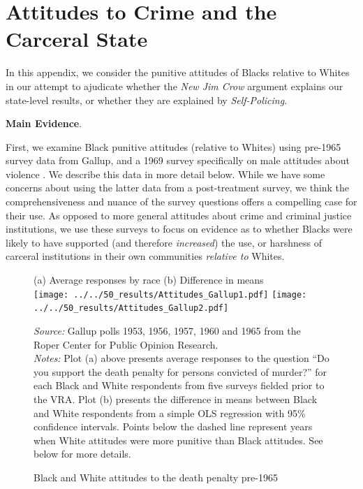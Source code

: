 \documentclass[12pt]{article}
\begin{document}
\section{Attitudes to Crime and the Carceral State}\label{appendix_attitudes}
\setcounter{table}{0}
\setcounter{figure}{0}
\renewcommand{\thetable}{I\arabic{table}}
\renewcommand{\thefigure}{I\arabic{figure}}
\normalsize

In this appendix, we consider the punitive attitudes of Blacks relative to Whites in our attempt to ajudicate whether the \emph{New Jim Crow} argument explains our state-level results, or whether they are explained by \emph{Self-Policing}.


\vspace{.25in}
\textbf{Main Evidence}.

First, we examine Black punitive attitudes (relative to Whites) using pre-1965 survey data from Gallup, and a 1969 survey specifically on male attitudes about violence \citep{Violence1969}.  We describe this data in more detail below.  While we have some concerns about using the latter data from a post-treatment survey, we think the comprehensiveness and nuance of the survey questions offers a compelling case for their use.  As opposed to more general attitudes about crime and criminal justice institutions, we use these surveys to focus on evidence as to whether Blacks were likely to have supported (and therefore \emph{increased}) the use, or harshness of carceral institutions in their own communities \emph{relative to} Whites.

\begin{figure}[h!]
 \begin{center}
 \caption{Black and White attitudes to the death penalty pre-1965}
 \smallskip \smallskip
 \small
 			(a) Average responses by race  \hspace*{1.2in} (b) Difference in means \\

			\texttt{[image: ../../50\_results/Attitudes\_Gallup1.pdf]}
			\texttt{[image: ../../50\_results/Attitudes\_Gallup2.pdf]} \\
			\label{figure_attitudes1}
			 \end{center}
{\scriptsize{\emph{Source:} Gallup polls 1953, 1956, 1957, 1960 and 1965 from the Roper Center for Public Opinion Research.  }} \\
{\scriptsize{\emph{Notes:} Plot (a) above presents average responses to the question ``Do you support the death penalty for persons convicted of murder?'' for each Black and White respondents from five surveys fielded prior to the VRA.  Plot (b) presents the difference in means between Black and White respondents from a simple OLS regression with 95\% confidence intervals.  Points below the dashed line represent years when White attitudes were more punitive than Black attitudes. See below for more details. \singlespacing }}
			\end{figure} \normalsize
\end{document}
